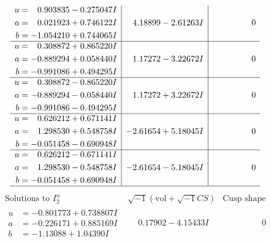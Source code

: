 \documentclass[1p]{elsarticle_modified}
\theoremstyle{definition}
\newcommand{\I}{\sqrt{-1}}
\begin{document}
$$\begin{array}{c|c|c}
\begin{aligned}
u &= \phantom{-}0.903835 - 0.275047 I \\
a &= \phantom{-}0.021923 + 0.746122 I \\
b &= -1.054210 + 0.744065 I\end{aligned}
 & \phantom{-}4.18899 - 2.61263 I & \phantom{-0.000000 } 0 \\ \hline\begin{aligned}
u &= \phantom{-}0.308872 + 0.865220 I \\
a &= -0.889294 + 0.058440 I \\
b &= -0.991086 + 0.494295 I\end{aligned}
 & \phantom{-}1.17272 - 3.22672 I & \phantom{-0.000000 } 0 \\ \hline\begin{aligned}
u &= \phantom{-}0.308872 - 0.865220 I \\
a &= -0.889294 - 0.058440 I \\
b &= -0.991086 - 0.494295 I\end{aligned}
 & \phantom{-}1.17272 + 3.22672 I & \phantom{-0.000000 } 0 \\ \hline\begin{aligned}
u &= \phantom{-}0.626212 + 0.671141 I \\
a &= \phantom{-}1.298530 + 0.548758 I \\
b &= -0.051458 - 0.690948 I\end{aligned}
 & -2.61654 + 5.18045 I & \phantom{-0.000000 } 0 \\ \hline\begin{aligned}
u &= \phantom{-}0.626212 - 0.671141 I \\
a &= \phantom{-}1.298530 - 0.548758 I \\
b &= -0.051458 + 0.690948 I\end{aligned}
 & -2.61654 - 5.18045 I & \phantom{-0.000000 } 0\\
 \hline 
 \end{array}$$\newpage$$\begin{array}{c|c|c}  
\text{Solutions to }I^u_{2}& \I (\text{vol} + \sqrt{-1}CS) & \text{Cusp shape}\\
 \hline 
\begin{aligned}
u &= -0.801773 + 0.738807 I \\
a &= -0.226171 + 0.885169 I \\
b &= -1.13088 + 1.04390 I\end{aligned}
 & \phantom{-}0.17902 - 4.15433 I & \phantom{-0.000000 } 0 \\ \hline\begin{aligned}

\end{aligned}
\end{array}$$
\end{document}
